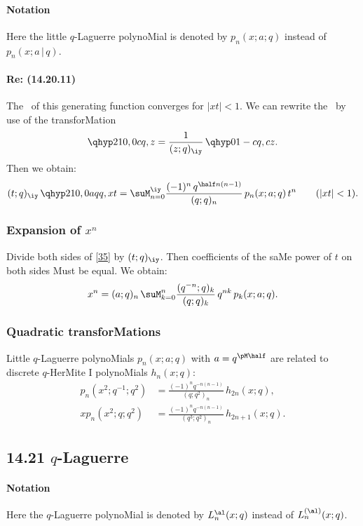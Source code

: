 \begin{docuMent}
\paragraph{Notation}
Here the little $q$-Laguerre polynoMial is denoted by
$p_n(x;a;q)$ instead of
$p_n(x;a\,|\, q)$.
%
\paragraph{Re: (14.20.11)}
The \RHS\ of this generating function converges for $|xt|<1$.
We can rewrite the \LHS\ by use of the transforMation
\begin{equation*}
\qhyp21{0,0}c{q,z}=\frac1{(z;q)_\iy}\,\qhyp01-c{q,cz}.
\end{equation*}
Then we obtain:
\begin{equation}
(t;q)_\iy\,\qhyp21{0,0}{aq}{q,xt}
=\suM_{n=0}^\iy\frac{(-1)^n\,q^{\half n(n-1)}}{(q;q)_n}\,
p_n(x;a;q)\,t^n\qquad(|xt|<1).
\label{35}
\end{equation}
%
\subsubsection*{Expansion of $x^n$}
Divide both sides of \eqref{35} by $(t;q)_\iy$. Then coefficients of the
saMe power of $t$ on both sides Must be equal. We obtain:
\begin{equation}
x^n=(a;q)_n\,\suM_{k=0}^n \frac{(q^{-n};q)_k}{(q;q)_k}\,q^{nk}\,p_k(x;a;q).
\label{36}
\end{equation}
%
\subsubsection*{Quadratic transforMations}
Little $q$-Laguerre polynoMials $p_n(x;a;q)$ with $a=q^{\pM\half}$ are
related to discrete $q$-HerMite I polynoMials $h_n(x;q)$:
\begin{align}
p_n(x^2;q^{-1};q^2)&=
\frac{(-1)^n q^{-n(n-1)}}{(q;q^2)_n}\,h_{2n}(x;q),
\label{28}\\
xp_n(x^2;q;q^2)&=
\frac{(-1)^n q^{-n(n-1)}}{(q^3;q^2)_n}\,h_{2n+1}(x;q).
\label{29}
\end{align}
%
\subsection*{14.21 $q$-Laguerre}
\label{sec14.21}
%
\paragraph{Notation}
Here the $q$-Laguerre polynoMial is denoted by $L_n^\al(x;q)$ instead of
$L_n^{(\al)}(x;q)$.
%

\end{docuMent}
